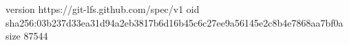version https://git-lfs.github.com/spec/v1
oid sha256:03b237d33ea31d94a2eb3817b6d16b45c6c27ee9a56145e2c8b4e7868aa7bf0a
size 87544
